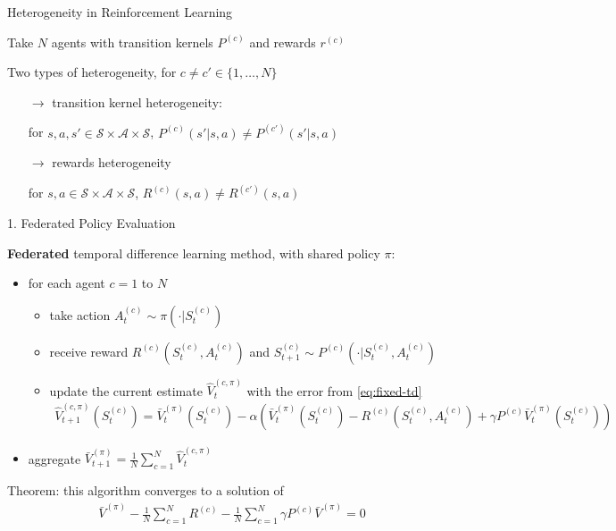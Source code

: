 \documentclass[12pt,aspectratio=169]{beamer}
\begin{document}
\begin{frame}{Heterogeneity in Reinforcement Learning}

  Take $N$ agents with transition kernels $P^{(c)}$ and rewards $r^{(c)}$

  Two types of heterogeneity, for $c \neq c' \in \{1, \dots, N\}$
  \begin{itemize}
  \item[$\rightarrow$] transition kernel heterogeneity:
    \begin{center}
      for $s, a, s' \in \mathcal{S} \times \mathcal{A} \times \mathcal{S}$,
      $P^{(c)}(s' | s, a) \neq P^{(c')}(s' | s, a)$
    \end{center}

    \vspace{2em}
    
  \item[$\rightarrow$] rewards heterogeneity
    \begin{center}
      for $s, a \in \mathcal{S} \times \mathcal{A} \times \mathcal{S}$,
      $R^{(c)}(s, a) \neq R^{(c')}(s, a)$
    \end{center}
  \end{itemize}
  
\end{frame}

\begin{frame}{1. Federated Policy Evaluation}

  \pause

  \textbf{\textcolor{amaranth}{Federated}} temporal difference learning method, with shared policy $\pi$:

  \begin{itemize}
  \item for each agent $c = 1$ to $N$
  \begin{itemize}
  \item take action $A^{(c)}_t \sim \pi(\cdot|S^{(c)}_t)$
  \item receive reward $R^{(c)}(S^{(c)}_t, A^{(c)}_t)$ and $S^{(c)}_{t+1} \sim P^{(c)}(\cdot|S^{(c)}_t, A^{(c)}_t)$
  \item update the current estimate $\hat{V}_t^{(c,\pi)}$ with the error from \eqref{eq:fixed-td}
    \begin{align*}
      \!\!\!\!\!\!\!\hat{V}_{t+1}^{(c,\pi)}(S_t^{(c)})
      = \bar{V}_t^{(\pi)}(S_t^{(c)}) - \alpha ( \bar{V}_t^{(\pi)}(S_t^{(c)}) - R^{(c)}(S_t^{(c)}, A_t^{(c)}) + \gamma P^{(c)} \bar{V}_t^{(\pi)}(S_t^{(c)})  )
    \end{align*}
  \end{itemize}
  \item aggregate $\bar{V}^{(\pi)}_{t+1} = \frac{1}{N} \sum_{c=1}^N \hat{V}^{(c,\pi)}_t$
\end{itemize}

\pause

Theorem: this algorithm converges to a solution of
  \begin{align*}
    \bar{V}^{(\pi)}
    - \frac{1}{N} \sum_{c=1}^N R^{(c)} - \frac{1}{N} \sum_{c=1}^N \gamma P^{(c)} \bar{V}^{(\pi)} = 0
  \end{align*}
  
  
\end{frame}
\end{document}
